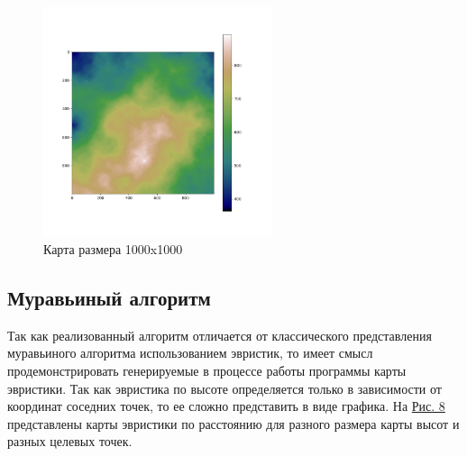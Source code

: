 \documentclass{article}
\numberwithin{equation}{section}
\begin{document}
			\begin{figure}[H]
				\centering
				\vspace{-0.5cm}
				\includegraphics[width=0.6\textwidth]{data/maps_example/1000x1000.png}
				\vspace{-0.5cm}
				\caption{Карта размера 1000x1000}\label{fig:map1000}
			\end{figure}

		\subsection{Муравьиный алгоритм}

			Так как реализованный алгоритм отличается от классического представления муравьиного алгоритма использованием эвристик, то имеет смысл продемонстрировать генерируемые в процессе работы программы карты эвристики. Так как эвристика по высоте определяется только в зависимости от координат соседних точек, то ее сложно представить в виде графика. На \hyperref[fig:heur_d]{Рис. 8} представлены карты эвристики по расстоянию для разного размера карты высот и разных целевых точек.
\end{document}
